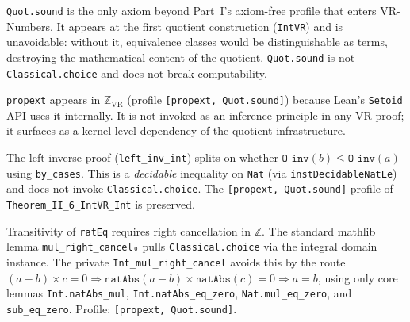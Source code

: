 \begin{remark}
\label{rem:quot_sound}
\leanok
{}
\texttt{Quot.sound} is the only axiom beyond Part~I's axiom-free profile that
enters VR-Numbers.  It appears at the first quotient construction
(\texttt{IntVR}) and is unavoidable: without it, equivalence classes would be
distinguishable as terms, destroying the mathematical content of the quotient.
\texttt{Quot.sound} is not \texttt{Classical.choice} and does not break
computability.
\end{remark}

\begin{remark}
\label{rem:propext_setoid}
\leanok
{}
\texttt{propext} appears in $\mathbb{Z}_{\mathrm{VR}}$ (profile \texttt{[propext,
Quot.sound]}) because Lean's \texttt{Setoid} API uses it internally.  It is
not invoked as an inference principle in any VR proof; it surfaces as a
kernel-level dependency of the quotient infrastructure.
\end{remark}

\begin{remark}
\label{rem:by_cases}
\leanok
{}
The left-inverse proof (\texttt{left\_inv\_int}) splits on whether
$\texttt{O\_inv}(b) \le \texttt{O\_inv}(a)$ using \texttt{by\_cases}.  This is
a \emph{decidable} inequality on \texttt{Nat} (via \texttt{instDecidableNatLe})
and does not invoke \texttt{Classical.choice}.  The \texttt{[propext,
Quot.sound]} profile of \texttt{Theorem\_II\_6\_IntVR\_Int} is preserved.
\end{remark}

\begin{remark}
\label{rem:int_cancel}
\leanok
{}
Transitivity of \texttt{ratEq} requires right cancellation in $\mathbb{Z}$.
The standard mathlib lemma \texttt{mul\_right\_cancel₀} pulls
\texttt{Classical.choice} via the integral domain instance.
The private \texttt{Int\_mul\_right\_cancel} avoids this by the route
$(a - b) \times c = 0 \Rightarrow \texttt{natAbs}(a - b) \times \texttt{natAbs}(c) = 0
\Rightarrow a = b$, using only core lemmas \texttt{Int.natAbs\_mul},
\texttt{Int.natAbs\_eq\_zero}, \texttt{Nat.mul\_eq\_zero}, and \texttt{sub\_eq\_zero}.
Profile: \texttt{[propext, Quot.sound]}.
\end{remark}

